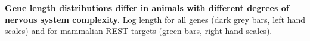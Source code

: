 \textbf{Gene length distributions differ in animals with different degrees of nervous system complexity.} Log length for all genes (dark grey bars, left hand scales) and for mammalian REST targets (green bars, right hand scales).